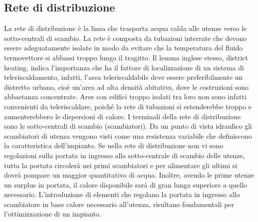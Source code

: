 \documentclass[laurea,oneside,11pt]{USiena_tesiLM}
\begin{document}
%
%
%
%

\subsection{Rete di distribuzione}
La rete di distribuzione è la linea che trasporta acqua calda alle utenze verso le sotto-centrali di scambio. La rete è composta da tubazioni interrate che  devono  essere adeguatamente isolate  in  modo  da  evitare  che  la temperatura  del fluido termovettore si abbassi troppo lungo il tragitto. 
Il  lemma  inglese  stesso,  district  heating,  indica  l'importanza  che  ha  il  fattore  di localizzazione  di un sistema  di  teleriscaldamento, infatti,  l'area  teleriscaldabile  deve  essere  preferibilmente  un distretto  urbano,  cioè  un'area  ad  alta  densità  abitativa,  dove  le  costruzioni  sono abbastanza concentrate.
Aree  con  edifici  troppo  isolati  tra  loro  non  sono  infatti  convenienti  da  teleriscaldare, poiché
la rete di tubazioni si estenderebbe troppo e aumenterebbero le dispersioni di calore.
I terminali della rete di distribuzione sono le sotto-centrali di scambio (scambiatori). Da un punto di vista idraulico gli scambiatori di utenza vengono visti come una resistenza variabile che definiscono la caratteristica dell'impianto. 
Se nella rete di distribuzione non vi sono regolazioni sulla portata in ingresso alla sotto-centrale di scambio delle utenze, tutta la portata circolerà nei primi scambiatori e per alimentare gli ultimi si dovrà pompare un maggior quantitativo di acqua. Inoltre, avendo le prime utenze un surplus in portata, il calore disponibile sarà di gran lunga superiore a quello necessario. 
L'introduzione di elementi che regolano la portata in ingresso allo scambiatore in base calore necessario all'utenza, risultano fondamentali per l'ottimizzazione di un impianto. 
\end{document}
